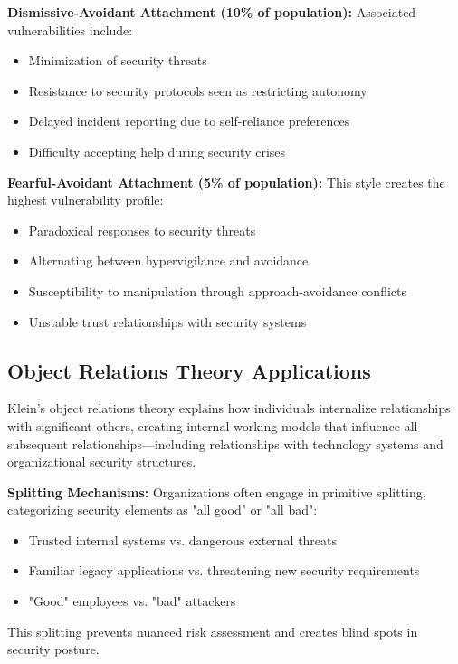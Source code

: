 \documentclass[11pt,a4paper]{article}
\begin{document}
\textbf{Dismissive-Avoidant Attachment (10\% of population):}
Associated vulnerabilities include:
\begin{itemize}
\item Minimization of security threats
\item Resistance to security protocols seen as restricting autonomy
\item Delayed incident reporting due to self-reliance preferences
\item Difficulty accepting help during security crises
\end{itemize}

\textbf{Fearful-Avoidant Attachment (5\% of population):}
This style creates the highest vulnerability profile:
\begin{itemize}
\item Paradoxical responses to security threats
\item Alternating between hypervigilance and avoidance
\item Susceptibility to manipulation through approach-avoidance conflicts
\item Unstable trust relationships with security systems
\end{itemize}

\subsection{Object Relations Theory Applications}

Klein's object relations theory\cite{klein1946} explains how individuals internalize relationships with significant others, creating internal working models that influence all subsequent relationships—including relationships with technology systems and organizational security structures.

\textbf{Splitting Mechanisms:}
Organizations often engage in primitive splitting, categorizing security elements as "all good" or "all bad":
\begin{itemize}
\item Trusted internal systems vs. dangerous external threats
\item Familiar legacy applications vs. threatening new security requirements
\item "Good" employees vs. "bad" attackers
\end{itemize}

This splitting prevents nuanced risk assessment and creates blind spots in security posture.
\end{document}
